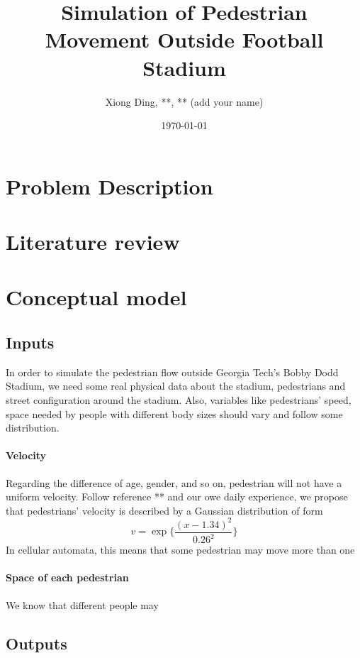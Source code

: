 \documentclass[paper=a4, fontsize=11pt]{article} %
\title{	Simulation of Pedestrian Movement Outside Football Stadium}
\author{Xiong Ding, **, ** (add your name)} %
\date{\today} %
\begin{document}
\maketitle %

\section{Problem Description}

\section{Literature review}

\section{Conceptual model}

\subsection{Inputs}

In order to simulate the pedestrian flow outside Georgia Tech's Bobby Dodd Stadium,
we need some real physical data about the stadium, pedestrians and street configuration
around the stadium. Also, variables like pedestrians' speed, space needed by people 
with different body sizes should vary and follow some distribution. 

\paragraph{Velocity} Regarding the difference of age, gender, and so on, pedestrian
will not have a uniform velocity. Follow reference ** and our owe daily experience, 
we propose that pedestrians' velocity is described by a Gaussian distribution of form
\begin{equation}
  \label{eq:velocity}
  v = \exp\{\frac{(x-1.34)^2}{0.26^2}\}
\end{equation}
In cellular automata, this means that some pedestrian may move more than one

\paragraph{Space of each pedestrian} We know that different people may

\subsection{Outputs}
\end{document}
